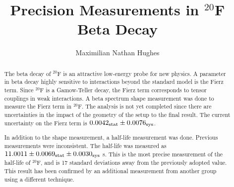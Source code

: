 \documentclass{msuphddissertation}
\author{Maximilian Nathan Hughes} %
\title{Precision Measurements in $^{20}$F Beta Decay} %
\begin{document}
\maketitlepage %


\begin{abstract}
The beta decay of $^{20}$F is an attractive low-energy probe for new physics.
A parameter in beta decay highly sensitive to interactions beyond the standard model is the Fierz term. 
Since $^{20}$F is a Gamow-Teller decay, the Fierz term corresponds to tensor couplings in weak interactions.
A beta spectrum shape measurement was done to measure the Fierz term in $^{20}$F.
The analysis is not yet completed since there are uncertainties in the impact of the geometry of the setup to the final result. 
The current uncertainty on the Fierz term is $0.0042_{\rm{stat}} \pm 0.0076_{\rm{sys}}$.

In addition to the shape measurement,  a half-life measurement was done.
Previous measurements were inconsistent. 
The half-life was measured as $11.0011 \pm   0.0069_{\rm{stat}}  \pm 0.0030_{\rm{sys}}$ s.
This is the most precise measurement of the half-life of $^{20}$F, and is 17 standard deviations away from the previously adopted value.
This result has been confirmed by an additional measurement from another group using a different technique.

\end{abstract}


\end{document}
